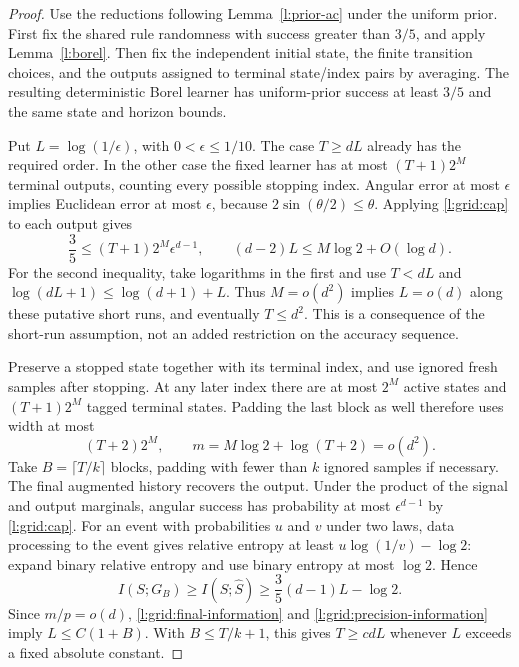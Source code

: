 \begin{proof}
Use the reductions following Lemma~\ref{l:prior-ac} under the uniform
prior.  First fix the shared rule randomness with success greater than
$3/5$, and apply Lemma~\ref{l:borel}.  Then fix the independent
initial state, the finite transition choices, and the outputs assigned
to terminal state/index pairs by averaging.  The resulting deterministic
Borel learner has uniform-prior success at least $3/5$ and the same
state and horizon bounds.

Put $L=\log(1/\epsilon)$, with $0<\epsilon\le1/10$.  The case $T\ge dL$
already has the required order.  In the other case the fixed learner has
at most $(T+1)2^M$ terminal outputs, counting every possible stopping
index.  Angular error at most $\epsilon$ implies Euclidean error at most
$\epsilon$, because $2\sin(\theta/2)\le\theta$.  Applying
\eqref{l:grid:cap} to each output gives
\begin{equation}\label{l:grid:output-count}
 \frac35\le(T+1)2^M\epsilon^{d-1},\qquad
 (d-2)L\le M\log2+O(\log d).
\end{equation}
For the second inequality, take logarithms in the first and use
$T<dL$ and $\log(dL+1)\le\log(d+1)+L$.  Thus $M=o(d^2)$ implies
$L=o(d)$ along these putative short runs, and eventually $T\le d^2$.
This is a consequence of the short-run assumption, not an added
restriction on the accuracy sequence.

Preserve a stopped state together with its terminal index, and use
ignored fresh samples after stopping.  At any later index there are at
most $2^M$ active states and $(T+1)2^M$ tagged terminal states.  Padding
the last block as well therefore uses width at most
\begin{equation}\label{l:grid:padded-width}
 (T+2)2^M,\qquad m=M\log2+\log(T+2)=o(d^2).
\end{equation}
Take $B=\lceil T/k\rceil$ blocks, padding with fewer than $k$ ignored
samples if necessary.  The final augmented history recovers the output.
Under the product of the signal and output marginals, angular success
has probability at most $\epsilon^{d-1}$ by \eqref{l:grid:cap}.
For an event with probabilities $u$ and $v$ under two laws, data
processing to the event gives relative entropy at least
$u\log(1/v)-\log2$: expand binary relative entropy and use binary
entropy at most $\log2$.  Hence
\begin{equation}\label{l:grid:precision-information}
 I(S;G_B)\ge I(S;\widehat S)
 \ge\frac35(d-1)L-\log2.
\end{equation}
Since $m/p=o(d)$, \eqref{l:grid:final-information} and
\eqref{l:grid:precision-information} imply $L\le C(1+B)$.
With $B\le T/k+1$, this gives $T\ge cdL$ whenever $L$ exceeds a fixed
absolute constant.


\end{proof}
